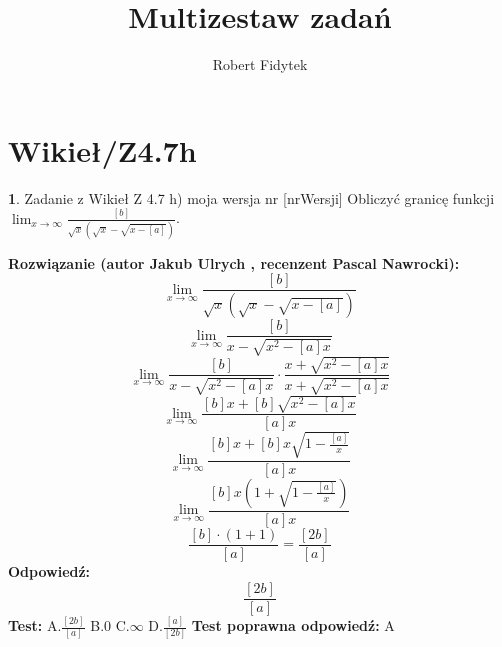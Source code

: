 \documentclass[12pt, a4paper]{article}
\title{Multizestaw zadań}
\author{Robert Fidytek}
\date{}
\theoremstyle{definition} %
\newtheorem{zad}{}
\newcommand{\kategoria}[1]{\section{#1}} %
\newcommand{\zadStart}[1]{\begin{zad}#1\newline} %
\newcommand{\zadStop}{\end{zad}}   %
\newcommand{\rozwStart}[2]{\noindent \textbf{Rozwiązanie (autor #1 , recenzent #2): }\newline} %
\newcommand{\rozwStop}{\newline}                                            %
\newcommand{\odpStart}{\noindent \textbf{Odpowiedź:}\newline}    %
\newcommand{\odpStop}{\newline}                                             %
\newcommand{\testStart}{\noindent \textbf{Test:}\newline} %
\newcommand{\testStop}{\newline} %
\newcommand{\kluczStart}{\noindent \textbf{Test poprawna odpowiedź:}\newline} %
\newcommand{\kluczStop}{\newline} %
\begin{document}
\maketitle


\kategoria{Wikieł/Z4.7h}
\zadStart{Zadanie z Wikieł Z 4.7 h) moja wersja nr [nrWersji]}
Obliczyć granicę funkcji $\lim_{x \to \infty}\frac{[b]}{\sqrt{x}(\sqrt{x}-\sqrt{x-[a]})}$.
\zadStop
\rozwStart{Jakub Ulrych}{Pascal Nawrocki}
$$\lim_{x \to \infty}\frac{[b]}{\sqrt{x}(\sqrt{x}-\sqrt{x-[a]})}$$
$$\lim_{x \to \infty}\frac{[b]}{x-\sqrt{x^{2}-[a]x}}$$
$$\lim_{x \to \infty}\frac{[b]}{x-\sqrt{x^{2}-[a]x}}\cdot\frac{x+\sqrt{x^{2}-[a]x}}{x+\sqrt{x^{2}-[a]x}}$$
$$\lim_{x \to \infty}\frac{[b]x+[b]\sqrt{x^{2}-[a]x}}{[a]x}$$
$$\lim_{x \to \infty}\frac{[b]x+[b]x\sqrt{1-\frac{[a]}{x}}}{[a]x}$$
$$\lim_{x \to \infty}\frac{[b]x(1+\sqrt{1-\frac{[a]}{x}})}{[a]x}$$
$$\frac{[b]\cdot(1+1)}{[a]}=\frac{[2b]}{[a]}$$
\rozwStop
\odpStart
$$\frac{[2b]}{[a]}$$
\odpStop
\testStart
A.$\frac{[2b]}{[a]}$
B.$0$
C.$\infty$
D.$\frac{[a]}{[2b]}$
\testStop
\kluczStart
A
\kluczStop
\end{document}

